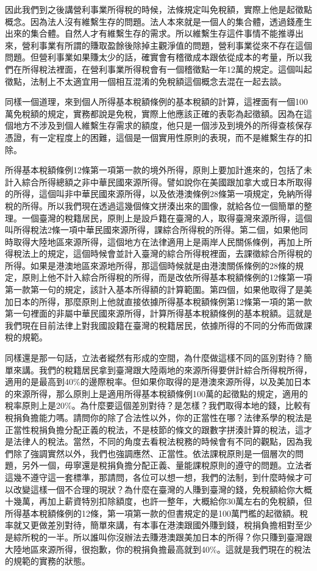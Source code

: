 \documentclass[]{ctexbook}
\begin{document}
因此我們到之後講營利事業所得稅的時候，法條規定叫免稅額，實際上他是起徵點概念。因為法人沒有維繫生存的問題。法人本來就是一個人的集合體，透過錢產生出來的集合體。自然人才有維繫生存的需求。所以維繫生存這件事情不能推導出來，營利事業有所謂的賺取盈餘後除掉主觀淨值的問題，營利事業從來不存在這個問題。但營利事業如果賺太少的話，確實會有稽徵成本跟依從成本的考量，所以我們在所得稅法裡面，在營利事業所得稅會有一個稽徵點一年12萬的規定。這個叫起徵點，法制上不太適宜用一個相互混淆的免稅額這個概念去混在一起去談。

同樣一個道理，來到個人所得基本稅額條例的基本稅額的計算，這裡面有一個100萬免稅額的規定，實務都說是免稅，實際上他應該正確的表彰為起徵額。因為在這個地方不涉及到個人維繫生存需求的額度，他只是一個涉及到境外的所得查核保存憑證，有一定程度上的困難，這個是一個實用性原則的表現，而不是維繫生存的扣除。

所得基本稅額條例12條第一項第一款的境外所得，原則上要加計進來的，包括了未計入綜合所得總額之非中華民國來源所得。譬如說你在美國跟加拿大或日本所取得的所得，這個叫非中華民國來源所得，以及依港澳條例28條第一項規定，免納所得稅的所得。所以我們現在透過這幾個條文拼湊出來的圖像，就給各位一個簡單的整理。一個臺灣的稅籍居民，原則上是設戶籍在臺灣的人，取得臺灣來源所得，這個叫所得稅法2條一項中華民國來源所得，課綜合所得稅的所得。第二個，如果他同時取得大陸地區來源所得，這個地方在法律適用上是兩岸人民關係條例，再加上所得稅法上的規定，這個時候會並計入臺灣的綜合所得稅裡面，去課徵綜合所得稅的所得。如果是港澳地區來源地所得，那這個時候就是由港澳關係條例的28條的規定，原則上他不計入綜合所得稅的所得，而是改依所得基本稅額條例的12條第一項第一款第一句的規定，該計入基本所得額的計算範圍。第四個，如果他取得了是美加日本的所得，那麼原則上他就直接依據所得基本稅額條例第12條第一項的第一款第一句裡面的非屬中華民國來源所得，計算所得基本稅額條例的基本稅額。這就是我們現在目前法律上對我國設籍在臺灣的稅籍居民，依據所得的不同的分佈而做課稅的規範。

同樣還是那一句話，立法者縱然有形成的空間，為什麼做這樣不同的區別對待？簡單來講。我們的稅籍居民拿到臺灣跟大陸兩地的來源所得要併計綜合所得稅所得，適用的是最高到40\%的邊際稅率。但如果你取得的是港澳來源所得，以及美加日本的來源所得，那么原則上是適用所得基本稅額條例100萬的起徵點的規定，適用的稅率原則上是20\%。為什麼要這個差別對待？是怎樣？我們取得本地的錢，比較有稅捐負擔能力嗎。請問你的除了合法性以外，你的正當性在哪？法律系學的稅法是正當性稅捐負擔分配正義的稅法，不是枝節的條文的跟數字拼湊計算的稅法，這才是法律人的稅法。當然，不同的角度去看稅法稅務的時候會有不同的觀點，因為我們除了強調實然以外，我們也強調應然、正當性。依法課稅原則是一個層次的問題，另外一個，毋寧還是稅捐負擔分配正義、量能課稅原則的遵守的問題。立法者這幾不遵守這一套標準，那請問，各位可以想一想，我們的法制，到什麼時候才可以改變這樣一個不合理的現狀？為什麼在臺灣的人賺到臺灣的錢，免稅額給你大概十幾萬，再加上薪資特別扣除額度，也許一整年，大概給你30萬左右的免稅額，但所得基本稅額條例的12條，第一項第一款的但書規定的是100萬門檻的起徵額。稅率就又更做差別對待，簡單來講，有本事在港澳跟國外賺到錢，稅捐負擔相對至少是綜所稅的一半。所以誰叫你沒辦法去賺港澳跟美加日本的所得？你只賺到臺灣跟大陸地區來源所得，很抱歉，你的稅捐負擔最高就到40\%。這就是我們現在的稅法的規範的實務的狀態。
\end{document}
